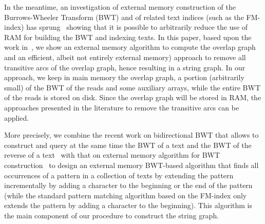\documentclass[runningheads,envcountsame,a4paper]{llncs}
\begin{document}
In the meantime, an investigation of external memory construction of the
Burrows-Wheeler Transform (BWT) and of related text indices (such as the
FM-index) has sprung~\cite{Bauer2011,Bauer2013,Ferragina2012} showing that it is possible to
arbitrarily reduce the use of RAM for building the BWT and indexing texts.
In this paper, based upon the work in~\cite{Bauer2011}, we show an external
memory algorithm to compute the overlap graph and an efficient, albeit not
entirely external memory) approach to remove all transitive arcs of the overlap
graph, hence resulting in a string graph.
%
%
In our approach, we keep in main memory the overlap graph, a portion (arbitrarily small)
of the BWT of the reads and some auxiliary arrays, while the entire BWT of the reads is stored on disk.
Since the overlap graph will be stored in RAM, the approaches presented in the
literature to remove the transitive arcs can be applied.


More precisely, we combine the recent work on bidirectional BWT that allows to
construct and query at the same time the BWT of a text and the BWT of the
reverse of a text~\cite{Lam2009} with that on external memory algorithm for BWT
construction~\cite{Bauer2011} to design an external memory BWT-based algorithm
that finds all occurrences of a pattern in a collection of texts by extending
the pattern incrementally by adding a character to the beginning or the end of
the pattern (while the standard pattern matching algorithm based on the FM-index
only extends the pattern by adding a character to the beginning).
This algorithm is the main component of our procedure to construct the string graph.
\end{document}

